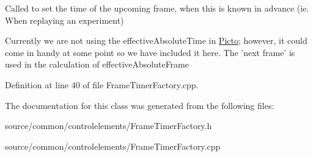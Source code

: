 Called to set the time of the upcoming frame, when this is known in advance (ie. When replaying an experiment) 

Currently we are not using the effective\-Absolute\-Time in \hyperlink{namespace_picto}{Picto}; however, it could come in handy at some point so we have included it here. The 'next frame' is used in the calculation of effective\-Absolute\-Frame 

Definition at line 40 of file Frame\-Timer\-Factory.\-cpp.



The documentation for this class was generated from the following files\-:\begin{DoxyCompactItemize}
\item 
source/common/controlelements/Frame\-Timer\-Factory.\-h\item 
source/common/controlelements/Frame\-Timer\-Factory.\-cpp\end{DoxyCompactItemize}
